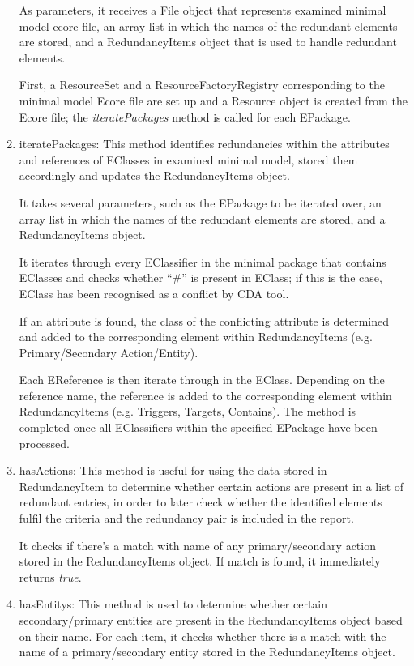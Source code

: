 \begin{enumerate}
	As parameters, it receives a File object that represents examined minimal model ecore file, an array list in which the names of the redundant elements are stored, and a RedundancyItems object that is used to handle redundant elements. 
	
	First, a ResourceSet and a ResourceFactoryRegistry corresponding to the minimal model Ecore file are set up and a Resource object is created from the Ecore file; the \textit{iteratePackages} method is called for each EPackage.
	
	\item iteratePackages: This method identifies redundancies within the attributes and references of EClasses in examined minimal model, stored them accordingly and updates the RedundancyItems object.
	
	It takes several parameters, such as the EPackage to be iterated over, an array list in which the names of the redundant elements are stored, and a RedundancyItems object. 
	
	It iterates through every EClassifier in the minimal package that contains EClasses and checks whether \enquote{\#} is present in EClass; if this is the case, EClass has been recognised as a conflict by CDA tool.
	
	If an attribute is found, the class of the conflicting attribute is determined and added to the corresponding element within RedundancyItems (e.g. Primary/Secondary Action/Entity). 
	
	Each EReference is then iterate through in the EClass. Depending on the reference name, the reference is added to the corresponding element within RedundancyItems (e.g. Triggers, Targets, Contains). The method is completed once all EClassifiers within the specified EPackage have been processed.
	
	\item hasActions: This method is useful for using the data stored in RedundancyItem to determine whether certain actions are present in a list of redundant entries, in order to later check whether the identified elements fulfil the criteria and the redundancy pair is included in the report.
	
	It checks if there's a match with name of any primary/secondary action stored in the RedundancyItems object. If match is found, it immediately returns \textit{true}.
	
	\item hasEntitys: This method is used to determine whether certain secondary/primary entities  are present in the RedundancyItems object based on their name. For each item, it checks whether there is a match with the name of a primary/secondary entity stored in the RedundancyItems object. 
	

\end{enumerate}
